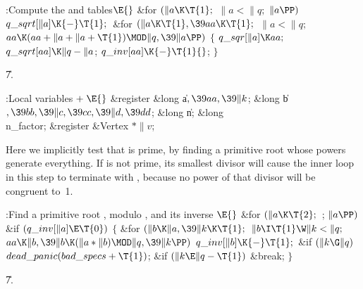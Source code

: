 \B{}:Compute the  and  tables\X${}\E{}$\6
\&{for} ${}(\|a\K\T{1};{}$ ${}\|a<\|q;{}$ ${}\|a\PP){}$\1\5
${}\\{q\_sqrt}[\|a]\K{-}\T{1};{}$\2\6
\&{for} ${}(\|a\K\T{1},\39\\{aa}\K\T{1};{}$ ${}\|a<\|q;{}$ ${}\\{aa}\K(\\{aa}+%
\|a+\|a+\T{1})\MOD\|q,\39\|a\PP){}$\5
${}\{{}$\1\6
${}\\{q\_sqr}[\|a]\K\\{aa};{}$\6
${}\\{q\_sqrt}[\\{aa}]\K\|q-\|a{}$;\6
${}\\{q\_inv}[\\{aa}]\K{-}\T{1}{}$;\6
\4${}\}{}$\2\par
\U7.\fi

\B{}:Local variables\X${}\mathrel+\E{}$\6
\&{register} \&{long} \|a${},\39\\{aa},\39\|k{}$;%
\6
\&{long} \|b${},\39\\{bb},\39\|c,\39\\{cc},\39\|d,\39\\{dd}{}$;\6
\&{long} \|n;\6
\&{long} \\{n\_factor};%
\6
\&{register} \&{Vertex} ${}{*}\|v{}$;\par
\fi

Here we implicitly test that  is prime, by finding a primitive
root whose powers generate everything. If  is not prime, its smallest
divisor will cause the inner loop in this step to terminate with ,
because no power of that divisor will be congruent to~1.

\Y\B\4:Find a primitive root , modulo , and its inverse %
\X${}\E{}$\6
\&{for} ${}(\|a\K\T{2};{}$  ; ${}\|a\PP){}$\1\6
\&{if} ${}(\\{q\_inv}[\|a]\E\T{0}){}$\5
${}\{{}$\1\6
\&{for} ${}(\|b\K\|a,\39\|k\K\T{1};{}$ ${}\|b\I\T{1}\W\|k<\|q;{}$ ${}\\{aa}\K%
\|b,\39\|b\K(\|a*\|b)\MOD\|q,\39\|k\PP){}$\1\5
${}\\{q\_inv}[\|b]\K{-}\T{1};{}$\2\6
\&{if} ${}(\|k\G\|q){}$\1\5
${}\\{dead\_panic}(\\{bad\_specs}+\T{1}){}$;\2\6
\&{if} ${}(\|k\E\|q-\T{1}){}$\1\5
\&{break};\2\6
\4${}\}{}$\2\2\par
\U7.\fi

